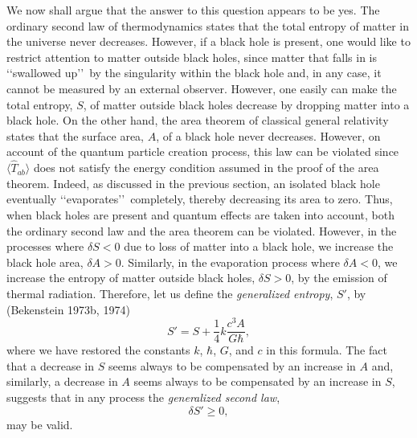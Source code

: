 We now shall argue that the answer to this question appears to be yes. The ordinary
second law of thermodynamics states that the total entropy of matter in the universe
never decreases. However, if a black hole is present, one would like to restrict
attention to matter outside black holes, since matter that falls in is \lq\lq swallowed
up\rq\rq\ by the singularity within the black hole and, in any case, it cannot be
measured by an external observer. However, one easily can make the total entropy,
\(S\), of matter outside black holes decrease by dropping matter into a black hole.
On the other hand, the area theorem of classical general relativity states that the
surface area, \(A\), of a black hole never decreases. However, on account of the
quantum particle creation process, this law can be violated since
\(\langle\widehat T_{ab}\rangle\) does not satisfy the energy condition assumed in
the proof of the area theorem. Indeed, as discussed in the previous section, an
isolated black hole eventually \lq\lq evaporates\rq\rq\ completely, thereby
decreasing its area to zero. Thus, when black holes are present and quantum effects
are taken into account, both the ordinary second law and the area theorem can be
violated. However, in the processes where \(\delta S<0\) due to loss of matter into
a black hole, we increase the black hole area, \(\delta A>0\). Similarly, in the
evaporation process where \(\delta A<0\), we increase the entropy of matter outside
black holes, \(\delta S>0\), by the emission of thermal radiation. Therefore, let us
define the \emph{generalized entropy}, \(S'\), by (Bekenstein 1973b, 1974)
\begin{equation}
  S'=S+\frac14 k\frac{c^3A}{G\hbar},
  \tag{14.4.1}\label{eq:14.4.1}
\end{equation}
where we have restored the constants \(k\), \(\hbar\), \(G\), and \(c\) in this
formula. The fact that a decrease in \(S\) seems always to be compensated by an
increase in \(A\) and, similarly, a decrease in \(A\) seems always to be compensated
by an increase in \(S\), suggests that in any process the \emph{generalized second
law},
\begin{equation}
  \delta S'\geq0,
  \tag{14.4.2}\label{eq:14.4.2}
\end{equation}
may be valid.


